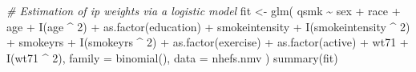\documentclass[
  10pt,
]{book}
\newenvironment{Shaded}{\begin{snugshade}}{\end{snugshade}}
\newcommand{\AttributeTok}[1]{\textcolor[rgb]{0.77,0.63,0.00}{#1}}
\newcommand{\CommentTok}[1]{\textcolor[rgb]{0.56,0.35,0.01}{\textit{#1}}}
\newcommand{\DecValTok}[1]{\textcolor[rgb]{0.00,0.00,0.81}{#1}}
\newcommand{\FunctionTok}[1]{\textcolor[rgb]{0.00,0.00,0.00}{#1}}
\newcommand{\NormalTok}[1]{#1}
\newcommand{\OtherTok}[1]{\textcolor[rgb]{0.56,0.35,0.01}{#1}}
\newcommand{\SpecialCharTok}[1]{\textcolor[rgb]{0.00,0.00,0.00}{#1}}
\begin{document}
\begin{Shaded}
\begin{Highlighting}[]
\CommentTok{\# Estimation of ip weights via a logistic model}
\NormalTok{fit }\OtherTok{\textless{}{-}} \FunctionTok{glm}\NormalTok{(}
\NormalTok{  qsmk }\SpecialCharTok{\textasciitilde{}}\NormalTok{ sex }\SpecialCharTok{+}\NormalTok{ race }\SpecialCharTok{+}\NormalTok{ age }\SpecialCharTok{+} \FunctionTok{I}\NormalTok{(age }\SpecialCharTok{\^{}} \DecValTok{2}\NormalTok{) }\SpecialCharTok{+}
    \FunctionTok{as.factor}\NormalTok{(education) }\SpecialCharTok{+}\NormalTok{ smokeintensity }\SpecialCharTok{+}
    \FunctionTok{I}\NormalTok{(smokeintensity }\SpecialCharTok{\^{}} \DecValTok{2}\NormalTok{) }\SpecialCharTok{+}\NormalTok{ smokeyrs }\SpecialCharTok{+} \FunctionTok{I}\NormalTok{(smokeyrs }\SpecialCharTok{\^{}} \DecValTok{2}\NormalTok{) }\SpecialCharTok{+}
    \FunctionTok{as.factor}\NormalTok{(exercise) }\SpecialCharTok{+} \FunctionTok{as.factor}\NormalTok{(active) }\SpecialCharTok{+}\NormalTok{ wt71 }\SpecialCharTok{+} \FunctionTok{I}\NormalTok{(wt71 }\SpecialCharTok{\^{}} \DecValTok{2}\NormalTok{),}
  \AttributeTok{family =} \FunctionTok{binomial}\NormalTok{(),}
  \AttributeTok{data =}\NormalTok{ nhefs.nmv}
\NormalTok{)}
\FunctionTok{summary}\NormalTok{(fit)}
\end{Highlighting}
\end{Shaded}
\end{document}
